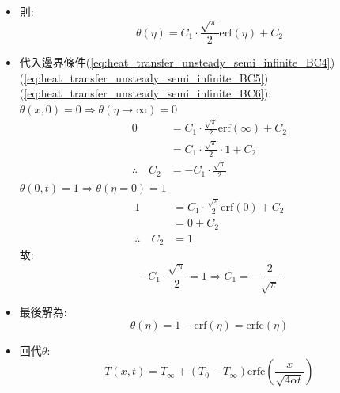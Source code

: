 \documentclass[../main.tex]{subfiles}
\begin{document}
\begin{itemize}
\begin{itemize}
\begin{equation}
    \end{equation}
    \item 則:
    \begin{equation}
      \theta(\eta) = C_1 \cdot \frac{\sqrt{\pi}}{2} \text{erf}(\eta) + C_2
    \end{equation}
    \item 代入邊界條件(\ref{eq:heat_transfer_unsteady_semi_infinite_BC4})
    (\ref{eq:heat_transfer_unsteady_semi_infinite_BC5})(\ref{eq:heat_transfer_unsteady_semi_infinite_BC6}):\\
    $\theta(x,0)=0 \Rightarrow \theta(\eta \to \infty) = 0$
    \begin{align}
      0 &= C_1 \cdot \frac{\sqrt{\pi}}{2} \text{erf}(\infty) + C_2 \nonumber\\
      &= C_1 \cdot \frac{\sqrt{\pi}}{2} \cdot 1 + C_2 \nonumber\\
      \therefore \quad C_2 &= - C_1 \cdot \frac{\sqrt{\pi}}{2}
    \end{align}
    $\theta(0,t) = 1 \Rightarrow \theta(\eta=0) = 1$
    \begin{align}
      1 &= C_1 \cdot \frac{\sqrt{\pi}}{2} \text{erf}(0) + C_2 \nonumber\\
      &= 0 + C_2 \nonumber\\
      \therefore \quad C_2 &= 1
    \end{align}
    故:
    \begin{equation}
      - C_1 \cdot \frac{\sqrt{\pi}}{2} = 1 \Rightarrow C_1 = -\frac{2}{\sqrt{\pi}}
    \end{equation}
    \item 最後解為:
    \begin{equation}
      \theta(\eta) = 1 - \text{erf}(\eta) = \text{erfc}(\eta)
    \end{equation}
    \item 回代$\theta$:
    \begin{equation}
      \boxed{
        T(x,t) = T_\infty + (T_0 - T_\infty) \text{erfc} \left(
          \frac{x}{\sqrt{4 \alpha t}}
        \right)
      }
    \end{equation}
  \end{itemize}
\end{itemize}
\end{document}

